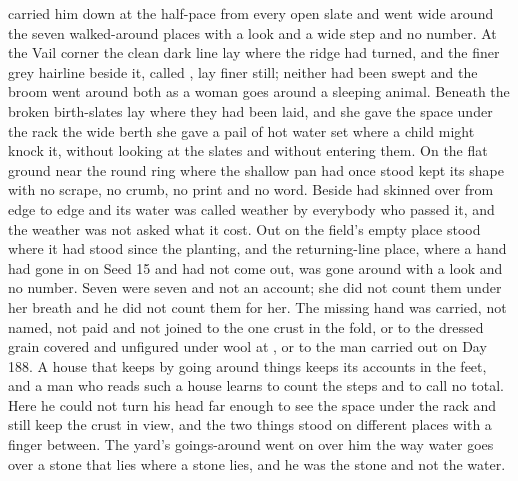  carried him down at the half-pace from every open slate and went wide around the seven walked-around places with a look and a wide step and no number. At the Vail corner the clean dark line lay where the  ridge had turned, and the finer grey hairline beside it, called , lay finer still; neither had been swept and the broom went around both as a woman goes around a sleeping animal. Beneath  the broken birth-slates lay where they had been laid, and she gave the space under the rack the wide berth she gave a pail of hot water set where a child might knock it, without looking at the slates and without entering them. On the flat ground near  the round ring where the shallow pan had once stood kept its shape with no scrape, no crumb, no print and no word. Beside   had skinned over from edge to edge and its water was called weather by everybody who passed it, and the weather was not asked what it cost. Out on  the field's empty place stood where it had stood since the planting, and the returning-line place, where a hand had gone in on Seed 15 and had not come out, was gone around with a look and no number. Seven were seven and not an account; she did not count them under her breath and he did not count them for her. The missing hand was carried, not named, not paid and not joined to the one crust in the fold, or to the dressed grain covered and unfigured under wool at , or to the man carried out on Day 188. A house that keeps by going around things keeps its accounts in the feet, and a man who reads such a house learns to count the steps and to call no total. Here he could not turn his head far enough to see the space under the rack and still keep the crust in view, and the two things stood on different places with a finger between. The yard's goings-around went on over him the way water goes over a stone that lies where a stone lies, and he was the stone and not the water.

